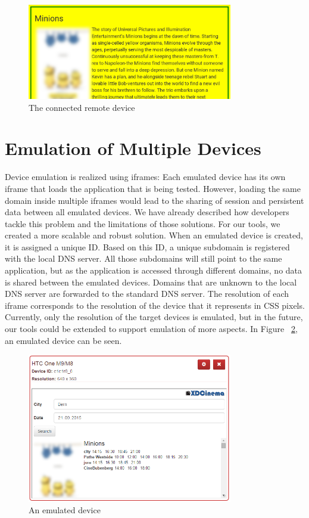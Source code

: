 \begin{figure}[H]
  \centering
    \includegraphics[width=0.8\textwidth]{images/screenshots/complete_remote_2.png}
	\caption{The connected remote device}
	\label{fig:complete_remote}
\end{figure}

\section{Emulation of Multiple Devices}

Device emulation is realized using iframes: Each emulated device has its own iframe that loads the application that is being tested. However, loading the same domain inside multiple iframes would lead to the sharing of session and persistent data between all emulated devices. We have already described how developers tackle this problem and the limitations of those solutions. For our tools, we created a more scalable and robust solution. When an emulated device is created, it is assigned a unique ID. Based on this ID, a unique subdomain is registered with the local DNS server. All those subdomains will still point to the same application, but as the application is accessed through different domains, no data is shared between the emulated devices. Domains that are unknown to the local DNS server are forwarded to the standard DNS server. The resolution of each iframe corresponds to the resolution of the device that it represents in CSS pixels. Currently, only the resolution of the target devices is emulated, but in the future, our tools could be extended to support emulation of more aspects. In Figure ~\ref{fig:emulated_device}, an emulated device can be seen.

\begin{figure}[H]
  \centering
    \includegraphics[width=0.8\textwidth]{images/screenshots/emulated_device_3.png}
	\caption{An emulated device}
	\label{fig:emulated_device}
\end{figure}

